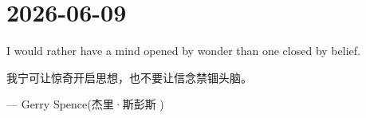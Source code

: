 \section*{2026-06-09}
I would rather have a mind opened by wonder than one closed by belief. \par
我宁可让惊奇开启思想，也不要让信念禁锢头脑。\par
\hfill ---  Gerry Spence(杰里·斯彭斯 )\par

